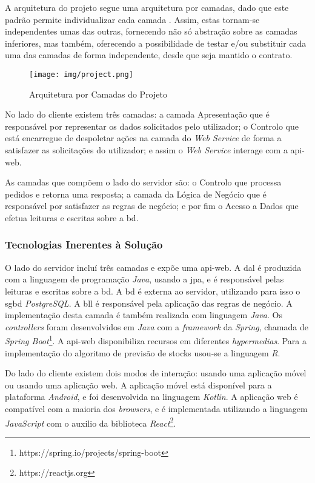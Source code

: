 A arquitetura do projeto segue uma arquitetura por camadas, dado que este padrão permite individualizar cada camada \cite{Haque:2007:ADA:1698307.1698331}. Assim, estas tornam-se independentes umas das outras, fornecendo não só abstração sobre as camadas inferiores, mas também, oferecendo a possibilidade de testar e/ou substituir cada uma das camadas de forma independente, desde que seja mantido o contrato.

\begin{figure}[H]
	\centering
	\texttt{[image: img/project.png]}
	\caption{Arquitetura por Camadas do Projeto}
	\label{project-layers-structure}
\end{figure}

No lado do cliente existem três camadas: a camada Apresentação que é responsável por representar os dados solicitados pelo utilizador; o Controlo que está encarregue de despoletar ações na camada do \textit{Web Service} de forma a satisfazer as solicitações do utilizador; e assim o \textit{Web Service} interage com a \gls{api-web}. 

As camadas que compõem o lado do servidor são: o Controlo que processa pedidos e retorna uma resposta; a camada da Lógica de Negócio que é responsável por satisfazer as regras de negócio; e por fim o Acesso a Dados que efetua leituras e escritas sobre a \acrshort{bd}.

\subsubsection{Tecnologias Inerentes à Solução}\label{subsec233}

O lado do servidor incluí três camadas e expõe uma \gls{api-web}. A \acrfull{dal} é produzida com a linguagem de programação \textit{Java}, usando a \acrfull{jpa}, e é responsável pelas leituras e escritas sobre a \acrfull{bd}. A \acrshort{bd} é externa ao servidor, utilizando para isso o \acrfull{sgbd} \textit{PostgreSQL}. A \acrfull{bll} é responsável pela aplicação das regras de negócio. A implementação desta camada é também realizada com linguagem \textit{Java}. Os \textit{controllers} foram desenvolvidos em \textit{Java} com a \textit{framework} da \textit{Spring}, chamada de \textit{Spring Boot}\footnote{https://spring.io/projects/spring-boot}. A \gls{api-web} disponibiliza recursos em diferentes \textit{hypermedias}. Para a implementação do algoritmo de previsão de stocks usou-se a linguagem \textit{R}.

Do lado do cliente existem dois modos de interação: usando uma aplicação móvel ou usando uma aplicação web. A aplicação móvel está disponível para a plataforma \textit{Android}, e foi desenvolvida na linguagem \textit{Kotlin}. A aplicação web é compatível com a maioria dos \textit{browsers}, e é implementada utilizando a linguagem \textit{JavaScript} com o auxilio da biblioteca \textit{React}\footnote{https://reactjs.org}.